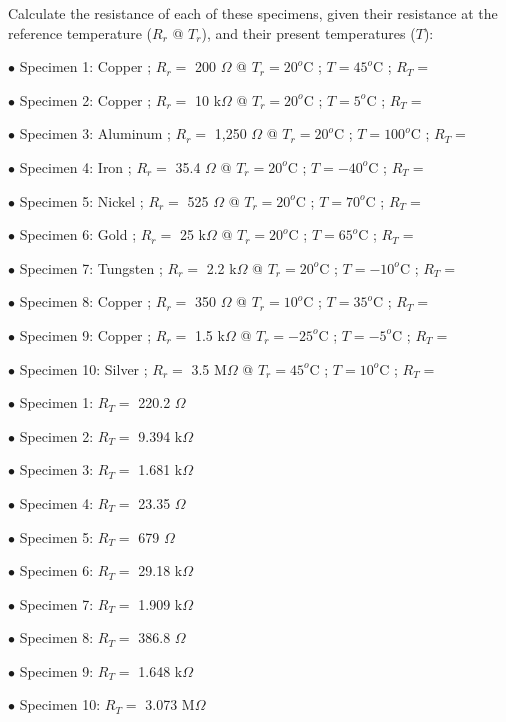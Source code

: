 

Calculate the resistance of each of these specimens, given their resistance at the reference temperature ($R_r$ @ $T_r$), and their present temperatures ($T$):

\medskip
\item{$\bullet$} Specimen 1: Copper ; $R_r =$ 200 $\Omega$ @ $T_r = 20^o$C ; $T = 45^o$C ; $R_T =$
\item{$\bullet$} Specimen 2: Copper ; $R_r =$ 10 k$\Omega$ @ $T_r = 20^o$C ; $T = 5^o$C ; $R_T =$
\item{$\bullet$} Specimen 3: Aluminum ; $R_r =$ 1,250 $\Omega$ @ $T_r = 20^o$C ; $T = 100^o$C ; $R_T =$
\item{$\bullet$} Specimen 4: Iron ; $R_r =$ 35.4 $\Omega$ @ $T_r = 20^o$C ; $T = -40^o$C ; $R_T =$
\item{$\bullet$} Specimen 5: Nickel ; $R_r =$ 525 $\Omega$ @ $T_r = 20^o$C ; $T = 70^o$C ; $R_T =$
\item{$\bullet$} Specimen 6: Gold ; $R_r =$ 25 k$\Omega$ @ $T_r = 20^o$C ; $T = 65^o$C ; $R_T =$
\item{$\bullet$} Specimen 7: Tungsten ; $R_r =$ 2.2 k$\Omega$ @ $T_r = 20^o$C ; $T = -10^o$C ; $R_T =$
\item{$\bullet$} Specimen 8: Copper ; $R_r =$ 350 $\Omega$ @ $T_r = 10^o$C ; $T = 35^o$C ; $R_T =$
\item{$\bullet$} Specimen 9: Copper ; $R_r =$ 1.5 k$\Omega$ @ $T_r = -25^o$C ; $T = -5^o$C ; $R_T =$
\item{$\bullet$} Specimen 10: Silver ; $R_r =$ 3.5 M$\Omega$ @ $T_r = 45^o$C ; $T = 10^o$C ; $R_T =$
\medskip







\medskip
\item{$\bullet$} Specimen 1: $R_T =$ 220.2 $\Omega$
\item{$\bullet$} Specimen 2: $R_T =$ 9.394 k$\Omega$
\item{$\bullet$} Specimen 3: $R_T =$ 1.681 k$\Omega$
\item{$\bullet$} Specimen 4: $R_T =$ 23.35 $\Omega$
\item{$\bullet$} Specimen 5: $R_T =$ 679 $\Omega$
\item{$\bullet$} Specimen 6: $R_T =$ 29.18 k$\Omega$
\item{$\bullet$} Specimen 7: $R_T =$ 1.909 k$\Omega$
\item{$\bullet$} Specimen 8: $R_T =$ 386.8 $\Omega$
\item{$\bullet$} Specimen 9: $R_T =$ 1.648 k$\Omega$
\item{$\bullet$} Specimen 10: $R_T =$ 3.073 M$\Omega$
\medskip

